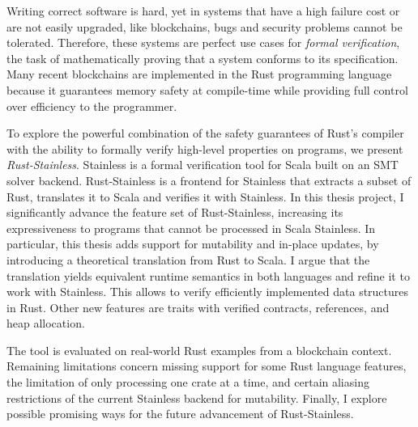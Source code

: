 Writing correct software is hard, yet in systems that have a high failure cost
or are not easily upgraded, like blockchains, bugs and security problems cannot
be tolerated. Therefore, these systems are perfect use cases for \emph{formal
verification}, the task of mathematically proving that a system conforms to its
specification. Many recent blockchains are implemented in the Rust programming
language because it guarantees memory safety at compile-time while providing
full control over efficiency to the programmer.

To explore the powerful combination of the safety guarantees of Rust's compiler
with the ability to formally verify high-level properties on programs, we
present \emph{Rust-Stainless}. Stainless is a formal verification tool for Scala
built on an SMT solver backend. Rust-Stainless is a frontend for Stainless that
extracts a subset of Rust, translates it to Scala and verifies it with
Stainless. In this thesis project, I significantly advance the feature set of
Rust-Stainless, increasing its expressiveness to programs that cannot be
processed in Scala Stainless. In particular, this thesis adds support for
mutability and in-place updates, by introducing a theoretical translation from
Rust to Scala. I argue that the translation yields equivalent runtime semantics
in both languages and refine it to work with Stainless. This allows to verify
efficiently implemented data structures in Rust. Other new features are traits
with verified contracts, references, and heap allocation.

The tool is evaluated on real-world Rust examples from a blockchain context.
Remaining limitations concern missing support for some Rust language features,
the limitation of only processing one crate at a time, and certain aliasing
restrictions of the current Stainless backend for mutability. Finally, I explore
possible promising ways for the future advancement of Rust-Stainless.

